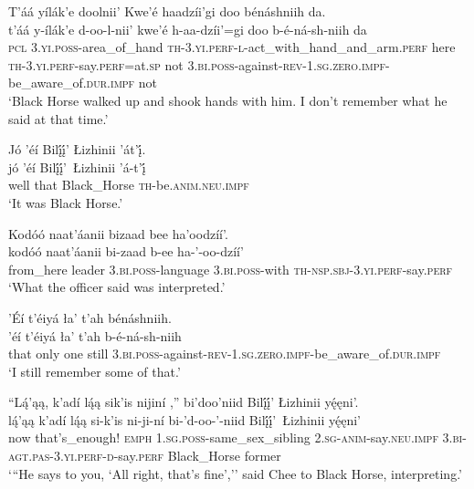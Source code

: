\ea\label{ex:text1-67-4}
T’áá yílák’e doolnii’ Kwe’é haadzíi’gi doo bénáshniih da.\\
\gll t’áá	y-ílák’e	d-oo-l-nii’	kwe’é	h-aa-dzíi’=gi	doo	b-é-ná-sh-niih	da\\
     \textsc{pcl}	3.\textsc{yi}.\textsc{poss}-area\_of\_hand	\textsc{th}-3.\textsc{yi}.\textsc{perf}-\textsc{l}-act\_with\_hand\_and\_arm.\textsc{perf}	here	\textsc{th}-3.\textsc{yi}.\textsc{perf}-say.\textsc{perf}=at.\textsc{sp}	not	3.\textsc{bi}.\textsc{poss}-against-\textsc{rev}-1.\textsc{sg}.\textsc{zero}.\textsc{impf}-be\_aware\_of.\textsc{dur}.\textsc{impf}	not\\
\glt `Black Horse walked up and shook hands with him. I don't remember what he said at that time.'
\z

\ea\label{ex:text1-67-5}
Jó ’éí Bilį́į́’ Łizhinii ’át’į́.\\
\gll jó	’éí	Bilį́į́’~{Łizhinii}	’á-t’į́\\
     well	that	Black\_Horse	\textsc{th}-be.\textsc{anim}.\textsc{neu}.\textsc{impf}\\
\glt `It was Black Horse.'
\z

\ea\label{ex:text1-67-6}
Kodóó naat’áanii bizaad bee ha’oodzíí’.\\
\gll kodóó	naat’áanii	bi-zaad	b-ee	ha-’-oo-dzíí’\\
     from\_here	leader	3.\textsc{bi}.\textsc{poss}-language	3.\textsc{bi}.\textsc{poss}-with	\textsc{th}-\textsc{nsp}.\textsc{sbj}-3.\textsc{yi}.\textsc{perf}-say.\textsc{perf}\\
\glt `What the officer said was interpreted.'
\z

\ea\label{ex:text1-67-7}
’Éí t’éiyá ła’ t’ah bénáshniih.\\
\gll ’éí	t’éiyá	ła’	t’ah	b-é-ná-sh-niih\\
     that	only	one	still	3.\textsc{bi}.\textsc{poss}-against-\textsc{rev}-1.\textsc{sg}.\textsc{zero}.\textsc{impf}-be\_aware\_of.\textsc{dur}.\textsc{impf}\\
\glt `I still remember some of that.'
\z

\ea\label{ex:text1-67-8}
``Lą́’ąą, k’adí lą́ą sik’is nijiní ,'' bi’doo’niid Bilį́į́’ Łizhinii yę́ęni’.\\
\gll lą́’ąą	k’adí	lą́ą	si-k’is	ni-ji-ní	bi-’d-oo-’-niid	Bilį́į́’~{Łizhinii}	yę́ęni’\\
     now	that's\_enough!	\textsc{emph}	1.\textsc{sg}.\textsc{poss}-same\_sex\_sibling	2.\textsc{sg}-\textsc{anim}-say.\textsc{neu}.\textsc{impf}	3.\textsc{bi}-\textsc{agt}.\textsc{pas}-3.\textsc{yi}.\textsc{perf}-\textsc{d}-say.\textsc{perf}	Black\_Horse	former\\
\glt `{``}He says to you, `All right, that's fine','' said Chee to Black Horse, interpreting.'
\z

